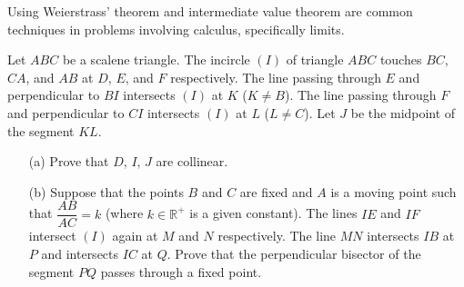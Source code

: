 \documentclass[11pt]{article}
\begin{document}
        \begin{remark}
            Using Weierstrass' theorem and intermediate value theorem are common techniques in problems involving calculus, specifically limits.
        \end{remark}

        \newpage

        \begin{problem}
            Let \(ABC\) be a scalene triangle. The incircle \((I)\) of triangle \(ABC\) touches \(BC\), \(CA\), and \(AB\) at \(D\), \(E\), and \(F\) respectively. The line passing through \(E\) and perpendicular to \(BI\) intersects \((I)\) at \(K\) (\(K \neq B\)). The line passing through \(F\) and perpendicular to \(CI\) intersects \((I)\) at \(L\) (\(L \neq C\)). Let \(J\) be the midpoint of the segment \(KL\).
            \begin{enumerate}
                \item[(a)] Prove that \(D\), \(I\), \(J\) are collinear.
                \item[(b)] Suppose that the points \(B\) and \(C\) are fixed and \(A\) is a moving point such that \(\dfrac{AB}{AC} = k\) (where \(k \in \mathbb{R}^+\) is a given constant). The lines \(IE\) and \(IF\) intersect \((I)\) again at \(M\) and \(N\) respectively. The line \(MN\) intersects \(IB\) at \(P\) and intersects \(IC\) at \(Q\). Prove that the perpendicular bisector of the segment \(PQ\) passes through a fixed point.
            \end{enumerate}
        \end{problem}
\end{document}
